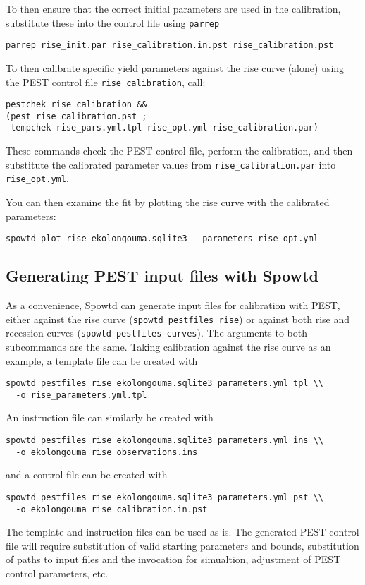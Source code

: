 \documentclass[11pt,a4paper]{article}
\begin{document}
To then ensure that the correct initial parameters are used in the
calibration, substitute these into the control file using
\texttt{parrep}
\begin{lstlisting}[frame=single]
parrep rise_init.par rise_calibration.in.pst rise_calibration.pst
\end{lstlisting}

To then calibrate specific yield parameters against the rise curve
(alone) using the PEST control file \texttt{rise\_calibration}, call:
\begin{lstlisting}[frame=single]
pestchek rise_calibration &&
(pest rise_calibration.pst ;
 tempchek rise_pars.yml.tpl rise_opt.yml rise_calibration.par)
\end{lstlisting}
These commands check the PEST control file, perform the calibration,
and then substitute the calibrated parameter values from
\texttt{rise\_calibration.par} into \texttt{rise\_opt.yml}.

You can then examine the fit by plotting the rise curve with the
calibrated parameters:
\begin{lstlisting}[frame=single]
spowtd plot rise ekolongouma.sqlite3 --parameters rise_opt.yml
\end{lstlisting}

\subsection{Generating PEST input files with Spowtd}
As a convenience, Spowtd can generate input files for calibration with
PEST, either against the rise curve (\texttt{spowtd pestfiles rise})
or against both rise and recession curves (\texttt{spowtd pestfiles
  curves}).  The arguments to both subcommands are the same.  Taking
calibration against the rise curve as an example, a template file
can be created with
\begin{lstlisting}[frame=single]
spowtd pestfiles rise ekolongouma.sqlite3 parameters.yml tpl \\
  -o rise_parameters.yml.tpl
\end{lstlisting}
An instruction file can similarly be created with
\begin{lstlisting}[frame=single]
spowtd pestfiles rise ekolongouma.sqlite3 parameters.yml ins \\
  -o ekolongouma_rise_observations.ins
\end{lstlisting}
and a control file can be created with
\begin{lstlisting}[frame=single]
spowtd pestfiles rise ekolongouma.sqlite3 parameters.yml pst \\
  -o ekolongouma_rise_calibration.in.pst
\end{lstlisting}
The template and instruction files can be used as-is.  The generated
PEST control file will require substitution of valid starting
parameters and bounds, substitution of paths to input files and the
invocation for simualtion, adjustment of PEST control parameters, etc.



\end{document}
